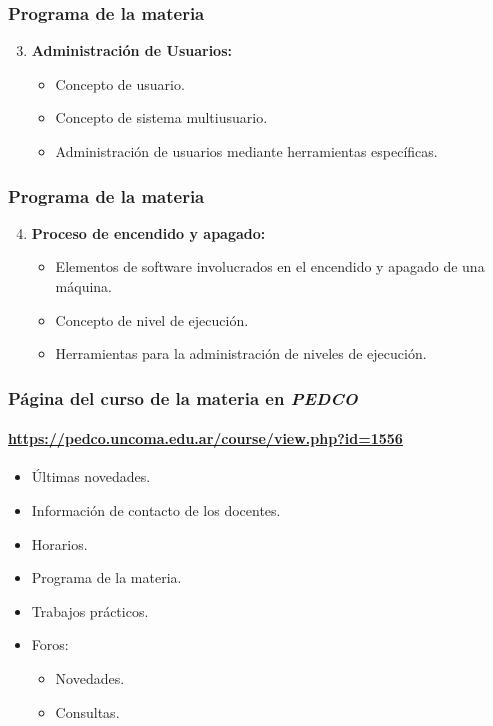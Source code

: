 \documentclass[11pt,a4paper,spanish]{beamer}
\begin{document}
\begin{frame}

    \frametitle{Programa de la materia}

\begin{enumerate}
    \setcounter{enumi}{2}
    \item \textbf{Administración de Usuarios:}
        \begin{itemize}
            \item Concepto de usuario.
            \item Concepto de sistema multiusuario.
            \item Administración de usuarios mediante herramientas
                específicas.
        \end{itemize}
\end{enumerate}

\end{frame}

\begin{frame}

    \frametitle{Programa de la materia}

\begin{enumerate}
    \setcounter{enumi}{3}
    \item \textbf{Proceso de encendido y apagado:}
        \begin{itemize}
            \item Elementos de software involucrados en el encendido y apagado
                de una máquina.
            \item Concepto de nivel de ejecución.
            \item Herramientas para la administración de niveles de ejecución.
        \end{itemize}
\end{enumerate}

\end{frame}

\begin{frame}

    \frametitle{Página del curso de la materia en \emph{PEDCO}}
    \framesubtitle{\url{https://pedco.uncoma.edu.ar/course/view.php?id=1556}}

\begin{itemize}
    \item Últimas novedades.
    \item Información de contacto de los docentes.
    \item Horarios.
    \item Programa de la materia.
    \item Trabajos prácticos.
    \item Foros:
        \begin{itemize}
            \item Novedades.
            \item Consultas.
        \end{itemize}
\end{itemize}

\end{frame}
\end{document}
